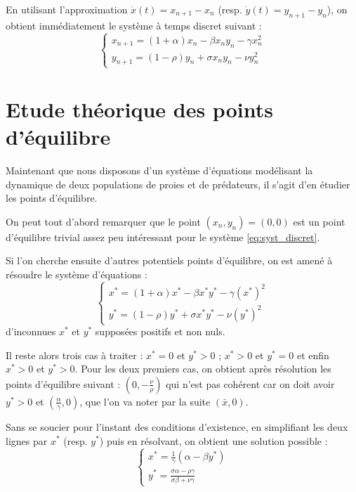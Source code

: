 En utilisant l'approximation $\dot{x}(t) = x_{n+1} - x_n$ (resp. $\dot{y}(t) = y_{n+1} - y_n$), on obtient immédiatement le système à temps discret suivant :
\begin{equation}
    \label{eq:syst_discret}
    \begin{cases}
        x_{n+1} = (1 + \alpha) x_n - \beta x_n y_n - \gamma x_n^2 \\
        y_{n+1} = (1 - \rho) y_n + \sigma x_n y_n - \nu y_n^2
    \end{cases}
\end{equation}


\section{Etude théorique des points d'équilibre}

Maintenant que nous disposons d'un système d'équations modélisant la dynamique de deux populations de proies et de prédateurs, il s'agit d'en étudier les points d'équilibre.

On peut tout d'abord remarquer que le point $(x_n, y_n) = (0, 0)$ est un point d'équilibre trivial assez peu intéressant pour le système \ref{eq:syst_discret}.

Si l'on cherche ensuite d'autres potentiels points d'équilibre, on est amené à résoudre le système d'équations :
\begin{equation}
    \begin{cases}
        x^* = (1 + \alpha) x^* - \beta x^* y^* - \gamma (x^*)^2 \\
        y^* = (1 - \rho) y^* + \sigma x^* y^* - \nu (y^*)^2
    \end{cases}
\end{equation}
d'inconnues $x^*$ et $y^*$ supposées positifs et non nuls.

Il reste alors trois cas à traiter : $x^* = 0$ et $y^* > 0$ ; $x^* > 0$ et $y^* = 0$ et enfin $x^* > 0$ et $y^* > 0$.
Pour les deux premiers cas, on obtient après résolution les points d'équilibre suivant : $(0, - \frac{\nu}{\rho})$ qui n'est pas cohérent car on doit avoir $y^* > 0$ et $(\frac{\alpha}{\gamma}, 0)$, que l'on va noter par la suite $(\bar{x}, 0)$.

Sans se soucier pour l'instant des conditions d'existence, en simplifiant les deux lignes par $x^*$ (resp. $y^*$) puis en résolvant, on obtient une solution possible :
\begin{equation}
    \label{eq:equilibre}
    \begin{cases}
        x^* = \frac{1}{\gamma} (\alpha - \beta y^*) \\
        y^* = \frac{\sigma \alpha - \rho \gamma}{\sigma \beta + \nu \gamma}
    \end{cases}
\end{equation}

